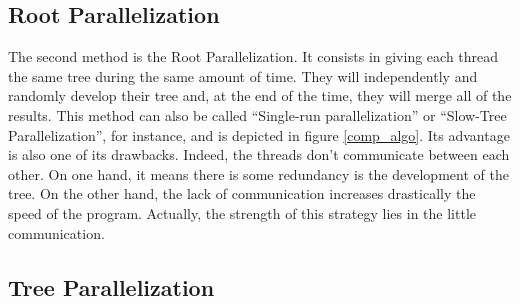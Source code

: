 \subsection{Root Parallelization}

The second method is the Root Parallelization. It consists in giving each thread the same tree during the same amount of time. They will independently and randomly develop their tree and, at the end of the time, they will merge all of the results. This method can also be called “Single-run parallelization” or “Slow-Tree Parallelization”, for instance, and is depicted in figure \ref{comp_algo}.
\newline
\newline
Its advantage is also one of its drawbacks. Indeed, the threads don’t communicate between each other. On one hand, it means there is some redundancy is the development of the tree. On the other hand, the lack of communication increases drastically the speed of the program. Actually, the strength of this strategy lies in the little communication.

\subsection{Tree Parallelization}

